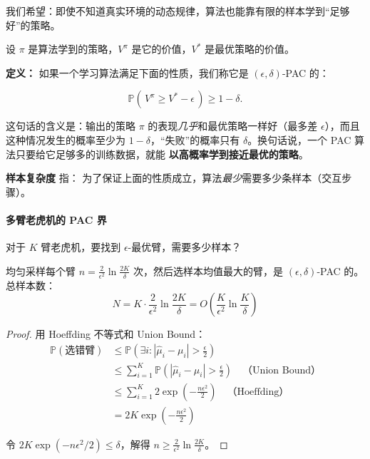 \begin{keyidea}
我们希望：即使不知道真实环境的动态规律，算法也能靠有限的样本学到“足够好”的策略。

设 $\pi$ 是算法学到的策略，$V^\pi$ 是它的价值，$V^*$ 是最优策略的价值。

\textbf{定义：}  
如果一个学习算法满足下面的性质，我们称它是 $(\epsilon,\delta)$-PAC 的：

\[
\mathbb{P}\!\left(\, V^\pi \ge V^* - \epsilon \,\right) \ge 1-\delta.
\]

这句话的含义是：输出的策略 $\pi$ 的表现\emph{几乎}和最优策略一样好（最多差 $\epsilon$），而且这种情况发生的概率至少为 $1-\delta$，“失败”的概率只有 $\delta$。换句话说，一个 PAC 算法只要给它足够多的训练数据，就能 \textbf{以高概率学到接近最优的策略}。

\vspace{0.5em}
\textbf{样本复杂度} 指：  
为了保证上面的性质成立，算法\emph{最少}需要多少条样本（交互步骤）。
\end{keyidea}


\paragraph{多臂老虎机的 PAC 界}

对于 $K$ 臂老虎机，要找到 $\epsilon$-最优臂，需要多少样本？

\begin{theorem}[朴素 PAC 界]
均匀采样每个臂 $n = \frac{2}{\epsilon^2} \ln\frac{2K}{\delta}$ 次，然后选样本均值最大的臂，是 $(\epsilon, \delta)$-PAC 的。总样本数：
\begin{equation}
    N = K \cdot \frac{2}{\epsilon^2} \ln\frac{2K}{\delta} = O\left(\frac{K}{\epsilon^2} \ln\frac{K}{\delta}\right)
\end{equation}
\end{theorem}

\begin{proof}
用 Hoeffding 不等式和 Union Bound：
\begin{align}
    \mathbb{P}(\text{选错臂}) &\leq \mathbb{P}\left(\exists i: |\hat{\mu}_i - \mu_i| > \frac{\epsilon}{2}\right) \\
    &\leq \sum_{i=1}^{K} \mathbb{P}\left(|\hat{\mu}_i - \mu_i| > \frac{\epsilon}{2}\right) \quad \text{（Union Bound）} \\
    &\leq \sum_{i=1}^{K} 2\exp\left(-\frac{n\epsilon^2}{2}\right) \quad \text{（Hoeffding）} \\
    &= 2K \exp\left(-\frac{n\epsilon^2}{2}\right)
\end{align}

令 $2K \exp(-n\epsilon^2/2) \leq \delta$，解得 $n \geq \frac{2}{\epsilon^2}\ln\frac{2K}{\delta}$。
\end{proof}

